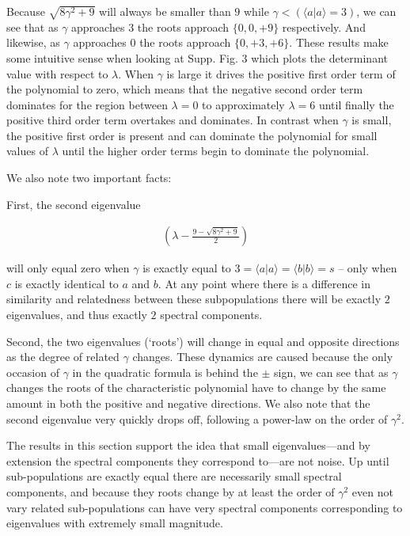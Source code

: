 \documentclass[
  letterpaper,
  DIV=11,
  numbers=noendperiod]{scrartcl}
\begin{document}
Because \(\sqrt{8\gamma^2 + 9}\) will always be smaller than \(9\) while
\(\gamma < (\langle a|a\rangle = 3)\), we can see that as \(\gamma\)
approaches \(3\) the roots approach \(\{0, 0, +9\}\) respectively. And
likewise, as \(\gamma\) approaches \(0\) the roots approach
\(\{0, +3, +6\}\). These results make some intuitive sense when looking
at Supp. Fig. 3 which plots the determinant value with respect to
\(\lambda\). When \(\gamma\) is large it drives the positive first order
term of the polynomial to zero, which means that the negative second
order term dominates for the region between \(\lambda = 0\) to
approximately \(\lambda = 6\) until finally the positive third order
term overtakes and dominates. In contrast when \(\gamma\) is small, the
positive first order is present and can dominate the polynomial for
small values of \(\lambda\) until the higher order terms begin to
dominate the polynomial.

We also note two important facts:

First, the second eigenvalue

\begin{align*}
\left(\lambda - \frac{9 - \sqrt{8\gamma^2 + 9}}{2}\right)
\end{align*}

will only equal zero when \(\gamma\) is exactly equal to
\(3=\langle a|a \rangle =\langle b|b \rangle = s\) -- only when \(c\) is
exactly identical to \(a\) and \(b\). At any point where there is a
difference in similarity and relatedness between these subpopulations
there will be exactly \(2\) eigenvalues, and thus exactly \(2\) spectral
components.

Second, the two eigenvalues (`roots') will change in equal and opposite
directions as the degree of related \(\gamma\) changes. These dynamics
are caused because the only occasion of \(\gamma\) in the quadratic
formula is behind the \(\pm\) sign, we can see that as \(\gamma\)
changes the roots of the characteristic polynomial have to change by the
same amount in both the positive and negative directions. We also note
that the second eigenvalue very quickly drops off, following a power-law
on the order of \(\gamma^2\).

The results in this section support the idea that small
eigenvalues---and by extension the spectral components they correspond
to---are not noise. Up until sub-populations are exactly equal there are
necessarily small spectral components, and because they roots change by
at least the order of \(\gamma^2\) even not vary related sub-populations
can have very spectral components corresponding to eigenvalues with
extremely small magnitude.
\end{document}
